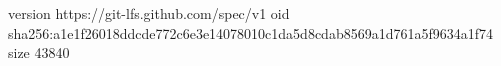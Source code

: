 version https://git-lfs.github.com/spec/v1
oid sha256:a1e1f26018ddcde772c6e3e14078010c1da5d8cdab8569a1d761a5f9634a1f74
size 43840
